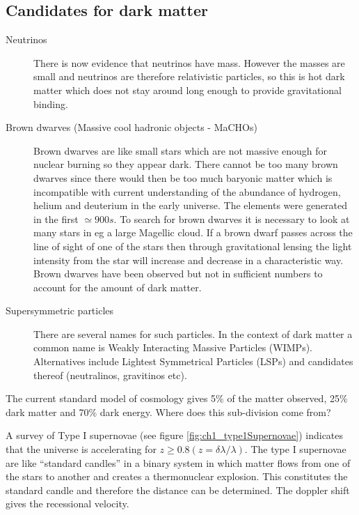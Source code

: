 \subsection{Candidates for dark matter}

\begin{description}
  \item[Neutrinos]There is now evidence that neutrinos have mass.  However the masses are small and neutrinos are therefore relativistic particles, so this is hot dark matter which does not stay around long enough to provide gravitational binding.
  \item[Brown dwarves (Massive cool hadronic objects - MaCHOs)]Brown dwarves are like small stars which are not massive enough for nuclear burning so they appear dark.  There cannot be too many brown dwarves since there would then be too much baryonic matter which is incompatible with current understanding of the abundance of hydrogen, helium and deuterium in the early universe.  The elements were generated in the first $\simeq 900 s$.  To search for brown dwarves it is necessary to look at many stars in eg a large Magellic cloud.  If a brown dwarf passes across the line of sight of one of the stars then through gravitational lensing the light intensity from the star will increase and decrease in a characteristic way.  Brown dwarves have been observed but not in sufficient numbers to account for the amount of dark matter.
  \item[Supersymmetric particles]There are several names for such particles.  In the context of dark matter a common name is Weakly Interacting Massive Particles (WIMPs).  Alternatives include Lightest Symmetrical Particles (LSPs) and candidates thereof (neutralinos, gravitinos etc).
\end{description}

The current standard model of cosmology gives 5\% of the matter observed, 25\% dark matter and 70\% dark energy.  Where does this sub-division come from?

A survey of Type I supernovae (see figure \ref{fig:ch1_type1Supernovae}) indicates that the universe is accelerating for $z \ge 0.8 (z = \delta \lambda/\lambda)$.  The type I supernovae are like ``standard candles'' in a binary system in which matter flows from one of the stars to another and creates a thermonuclear explosion.  This constitutes the standard candle and therefore the distance can be determined.  The doppler shift gives the recessional velocity.


